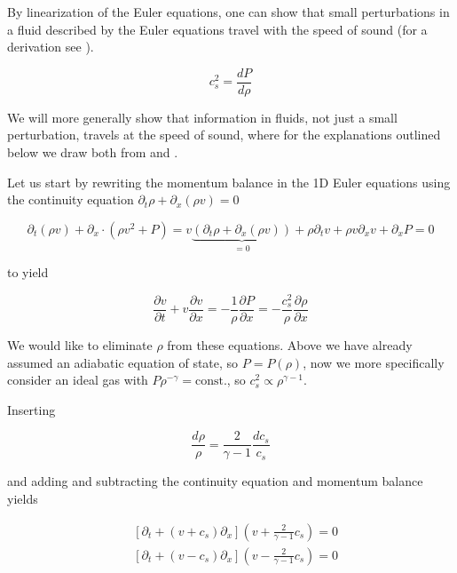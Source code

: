 By linearization of the Euler equations,
one can show that small perturbations in a fluid described by the Euler equations
travel with the speed of sound
(for a derivation see \cite[Sec. 2.4.1]{hahn19}). 

\begin{equation}
    c_s^2 = \frac{dP}{d\rho}
\end{equation}

We will more generally show that information in fluids, not just a small perturbation, travels at the
speed of sound, where for the explanations outlined below we draw both
from \cite[Sec. 4.5.1]{tong} and \cite[Sec. 4.3.1]{sormani22}.

Let us start by rewriting the momentum balance in the 1D Euler equations
using the continuity equation $\partial_t \rho + \partial_x (\rho v) = 0$

\begin{equation}
    \partial_t (\rho v) + \partial_x \cdot (\rho v^2 + P) = v \underbrace{\left(\partial_t \rho + \partial_x (\rho v) \right)}_{=0} + \rho \partial_t v + \rho v \partial_x v + \partial_x P = 0
\end{equation}

to yield

\begin{equation}
    \frac{\partial v}{\partial t} + v \frac{\partial v}{\partial x} = -\frac{1}{\rho} \frac{\partial P}{\partial x} = -\frac{c_s^2}{\rho} \frac{\partial \rho}{\partial x}
\end{equation}

We would like to eliminate $\rho$ from these equations. Above we have already assumed
an adiabatic equation of state, so $P = P(\rho)$, now we more specifically
consider an ideal gas with $P\rho^{-\gamma} = \text{const.}$, so $c_s^2 \propto \rho^{\gamma - 1}$.

Inserting

\begin{equation}
    \frac{d\rho}{\rho} = \frac{2}{\gamma - 1} \frac{dc_s}{c_s}
\end{equation}

and adding and subtracting the continuity equation and momentum balance yields

\begin{equation}
    \begin{aligned}
        &\left[\partial_t+\left(v+c_{s}\right) \partial_x\right]\left(v+\frac{2}{\gamma-1} c_{s}\right)=0\\
        &\left[\partial_t+\left(v-c_{s}\right) \partial_x\right]\left(v-\frac{2}{\gamma-1} c_{s}\right)=0
    \end{aligned}
\end{equation}

